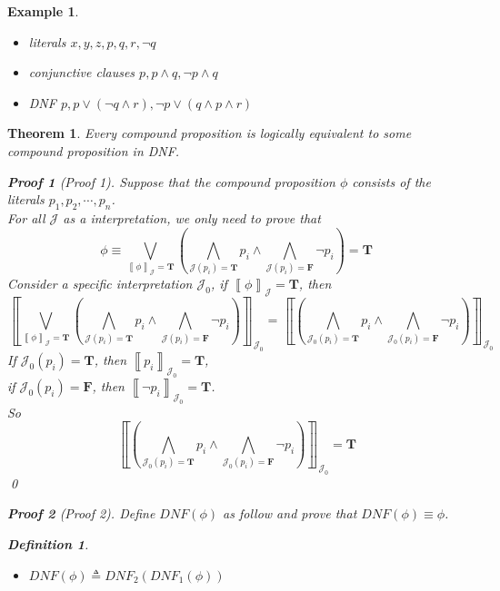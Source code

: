 \documentclass{ctexart}
\newcommand{\。}{．} %
\newcommand{\lb}{\left\llbracket}
\newcommand{\rb}{\right\rrbracket}
\newenvironment{huangse}{
    \begin{tcolorbox}[enhanced, breakable, colback=qhuang, boxrule=0pt, frame hidden,
        borderline west={0.7mm}{0.1mm}{shuang}]
    }
    {\end{tcolorbox}}
\newenvironment{zise}{
    \begin{tcolorbox}[enhanced, breakable, colback=qzi, boxrule=0pt, frame hidden,
        borderline west={0.7mm}{0.1mm}{szi}]
    }
    {\end{tcolorbox}}
\theoremstyle{t} %
\newtheorem{dyhj}{\color{slv} Definition}[subsection] %
\newtheorem{dlhj}{\color{shuang} Theorem}[subsection]
\newtheorem{lthj}{\color{szi} Example}[subsection]
\newtheorem*{zmhj}{\color{slan} Proof}
\newenvironment{dl}{\begin{huangse}\begin{dlhj}}{\end{dlhj}\end{huangse}}
\newenvironment{lt}{\begin{zise}\begin{lthj}}{\end{lthj}\end{zise}}
\begin{document}
\begin{lt} \quad
    \begin{itemize}
        \item literals $x, y, z, p, q, r, \lnot q$
        \item conjunctive clauses $p, p \land q, \lnot p \land q$
        \item DNF $p, p \lor (\lnot q \land r), \lnot p \lor (q \land p \land r)$
    \end{itemize}
\end{lt}

\begin{dl}
    Every compound proposition is logically equivalent to some compound proposition in DNF.
    \begin{zmhj}[Proof 1]
        Suppose that the compound proposition $\phi$ consists of the literals $p_1, p_2, \cdots, p_n$. \\
        For all $\mathcal{J}$ as a interpretation, we only need to prove that 
        \[
            \phi \equiv \bigvee_{\lb \phi \rb_\mathcal{J} = \mathbf{T}}\left(\bigwedge_{\mathcal{J}(p_i) = \mathbf{T}}p_i \land \bigwedge_{\mathcal{J}(p_i) = \mathbf{F}}\lnot p_i \right) = \mathbf{T}
        \]
        Consider a specific interpretation $\mathcal{J}_0$, if $\lb \phi\rb_\mathcal{J} = \mathbf{T}$, then
        \[
            \left\llbracket \bigvee_{\lb \phi \rb_\mathcal{J} = \mathbf{T}}\left(\bigwedge_{\mathcal{J}(p_i) = \mathbf{T}}p_i \land \bigwedge_{\mathcal{J}(p_i) = \mathbf{F}}\lnot p_i \right) \right\rrbracket_{\mathcal{J}_0} 
             = \lb \left(\bigwedge_{\mathcal{J}_0(p_i) = \mathbf{T}}p_i \land \bigwedge_{\mathcal{J}_0(p_i) = \mathbf{F}}\lnot p_i\right)\rb_{\mathcal{J}_0} 
        \]
        If $\mathcal{J}_0(p_i) = \mathbf{T}$, then $\lb p_i \rb_{\mathcal{J_0}} = \mathbf{T}$, \\
        if $\mathcal{J}_0(p_i) = \mathbf{F}$, then $\lb \lnot p_i \rb_{\mathcal{J_0}} = \mathbf{T}$. \\
        So
        \[
            \lb \left(\bigwedge_{\mathcal{J}_0(p_i) = \mathbf{T}}p_i \land \bigwedge_{\mathcal{J}_0(p_i) = \mathbf{F}}\lnot p_i\right)\rb_{\mathcal{J}_0} = \mathbf{T}
        \]
        \qed
    \end{zmhj}
    \begin{zmhj}[Proof 2]
        Define $DNF(\phi)$ as follow and prove that $DNF(\phi) \equiv \phi$. 
        \begin{dyhj}
            \begin{itemize}
                \item $DNF(\phi) \triangleq DNF_2(DNF_1(\phi))$

\end{itemize}
\end{dyhj}
\end{zmhj}
\end{dl}
\end{document}
